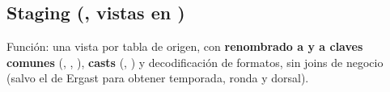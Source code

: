 \subsection{Staging (, vistas en )}

Función: una vista por tabla de origen, con \textbf{renombrado a  y a claves comunes} (, , ), \textbf{casts} (, ) y decodificación de formatos, sin joins de negocio (salvo el de Ergast para obtener temporada, ronda y dorsal).

